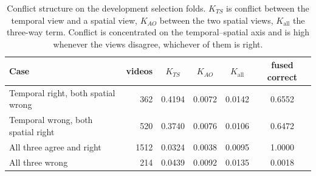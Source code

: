 \begin{table}[t]
\centering
\caption{Conflict structure on the development selection folds. $K_{TS}$ is conflict between the temporal view and a spatial view, $K_{AO}$ between the two spatial views, $K_{\mathrm{all}}$ the three-way term. Conflict is concentrated on the temporal--spatial axis and is high whenever the views disagree, whichever of them is right.}
\label{tab:conflict}
\small
\begin{tabular}{lrcccc}
\toprule
Case & videos & $K_{TS}$ & $K_{AO}$ & $K_{\mathrm{all}}$ & fused correct \\
\midrule
Temporal right, both spatial wrong & 362 & 0.4194 & 0.0072 & 0.0142 & 0.6552 \\
Temporal wrong, both spatial right & 520 & 0.3740 & 0.0076 & 0.0106 & 0.6472 \\
All three agree and right & 1512 & 0.0324 & 0.0038 & 0.0095 & 1.0000 \\
All three wrong & 214 & 0.0439 & 0.0092 & 0.0135 & 0.0018 \\
\bottomrule
\end{tabular}
\end{table}
